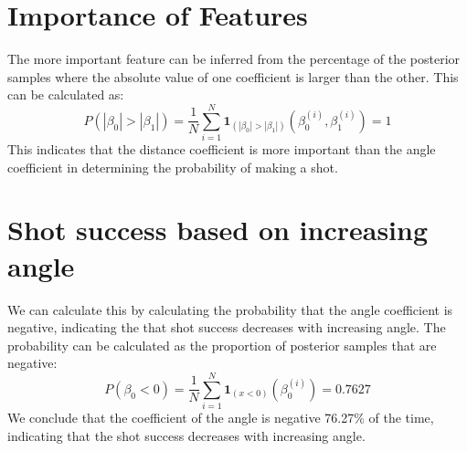 \documentclass[9pt]{IEEEtran}
\begin{document}
\vspace*{-0.6cm}
\section{Importance of Features}
The more important feature can be inferred from the percentage of the posterior samples where the absolute value of one coefficient is larger than the other.
This can be calculated as:
\begin{equation}
    P(|\beta_0| > |\beta_1|) = \frac{1}{N} \sum_{i=1}^{N} \mathbf{1}_{(|\beta_0| > |\beta_1|)}(\beta_0^{(i)}, \beta_1^{(i)}) = 1
\end{equation}
This indicates that the distance coefficient is more important than the angle coefficient in determining the probability of making a shot.                  


\section{Shot success based on increasing angle}
We can calculate this by calculating the probability that the angle coefficient is negative, indicating the that shot success decreases with increasing angle.
The probability can be calculated as the proportion of posterior samples that are negative:
\begin{equation}
    P(\beta_0 < 0) = \frac{1}{N} \sum_{i=1}^{N} \mathbf{1}_{(x < 0)}(\beta_0^{(i)}) = 0.7627
\end{equation}
We conclude that the coefficient of the angle is negative 76.27\% of the time, indicating that the shot success decreases with increasing angle.





\end{document}
